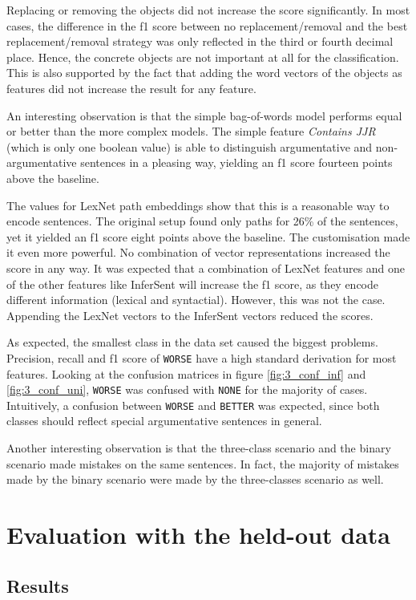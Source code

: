 Replacing or removing the objects did not increase the score significantly. In most cases, the difference in the f1 score between no replacement/removal and the best replacement/removal strategy was only reflected in the third or fourth decimal place. Hence, the concrete objects are not important at all for the classification. This is also supported by the fact that adding the word vectors of the objects as features did not increase the result for any feature.

An interesting observation is that the simple bag-of-words model performs equal or better than the more complex models. The simple feature \emph{Contains JJR} (which is only one boolean value) is able to distinguish argumentative and non-argumentative sentences in a pleasing way, yielding an f1 score fourteen points above the baseline.

The values for LexNet path embeddings show that this is a reasonable way to encode sentences. The original setup found only paths for 26\% of the sentences, yet it yielded an f1 score eight points above the baseline. The customisation made it even more powerful. No combination of vector representations increased the score in any way. It was expected that a combination of LexNet features and one of the other features like InferSent will increase the f1 score, as they encode different information (lexical and syntactial). However, this was not the case. Appending the LexNet vectors to the InferSent vectors reduced the scores.

As expected, the smallest class in the data set caused the biggest problems. Precision, recall and f1 score of \texttt{WORSE} have a high standard derivation for most features. Looking at the confusion matrices in figure \ref{fig:3_conf_inf} and \ref{fig:3_conf_uni}, \texttt{WORSE} was confused with \texttt{NONE} for the majority of cases. Intuitively, a confusion between \texttt{WORSE} and \texttt{BETTER} was expected, since both classes should reflect special argumentative sentences in general.

Another interesting observation is that the three-class scenario and the binary scenario made mistakes on the same sentences. In fact, the majority of mistakes made by the binary scenario were made by the three-classes scenario as well.


\section{Evaluation with the held-out data}
\subsection{Results}
\label{sec:final}

